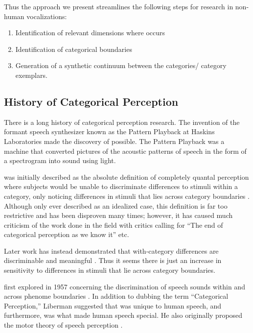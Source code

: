 Thus the approach we present streamlines the following steps for \CP research in non-human vocalizations:
\begin{enumerate}
    \item Identification of relevant dimensions where \CP occurs
    \item Identification of categorical boundaries
    \item Generation of a synthetic continuum between the categories/ category exemplars.
\end{enumerate}

\subsection{History of Categorical Perception}

There is a long history of categorical perception research.
The invention of the formant speech synthesizer known as the Pattern Playback at Haskins Laboratories \cite{patternplayback} made the discovery of \CP possible.
The Pattern Playback was a machine that converted pictures of the acoustic patterns of speech in the form of a spectrogram into sound using light.

\CP was initially described as the absolute definition of completely quantal perception where subjects would be unable to discriminate differences to stimuli within a category, only noticing differences in stimuli that lies across category boundaries \cite{liberman1957discrimination, Studdert1970motor}. Although only ever described as an idealized case, this definition is far too restrictive and has been disproven many times; however, it has caused much criticism of the work done in the \CP field with critics calling for ``The end of categorical perception as we know it'' \cite{schouten2003end} etc.

Later work has instead demonstrated that with-category differences are discriminable \cite{pisoni1974reaction,carney1977noncategorical,massaro1983categorical} and meaningful \cite{miller1997internal,mcmurray2002gradient,mcmurray2008gradient}. Thus it seems there is just an increase in sensitivity to differences in stimuli that lie across category boundaries.

\CP first explored in 1957 concerning the discrimination of speech sounds within and across phenome boundaries \cite{liberman1957discrimination}.  In addition to dubbing the term ``Categorical Perception,'' Liberman suggested that \CP was unique to human speech, and furthermore, was what made human speech special. He also originally proposed the motor theory of speech perception \cite{liberman1967perception}.


